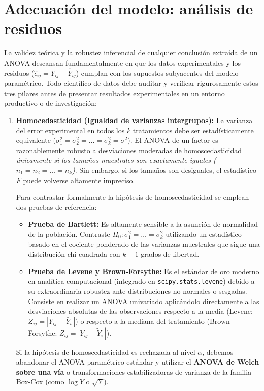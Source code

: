 \section{Adecuación del modelo: análisis de residuos}

La validez teórica y la robustez inferencial de cualquier conclusión extraída de un ANOVA descansan fundamentalmente en que los datos experimentales y los residuos ($\hat{\epsilon}_{ij} = Y_{ij} - \hat{Y}_{ij}$) cumplan con los supuestos subyacentes del modelo paramétrico. Todo científico de datos debe auditar y verificar rigurosamente estos tres pilares antes de presentar resultados experimentales en un entorno productivo o de investigación:

\begin{enumerate}
	\item \textbf{Homocedasticidad (Igualdad de varianzas intergrupos):} La varianza del error experimental en todos los $k$ tratamientos debe ser estadísticamente equivalente ($\sigma_1^2 = \sigma_2^2 = \ldots = \sigma_k^2 = \sigma^2$). El ANOVA de un factor es razonablemente robusto a desviaciones moderadas de homoscedasticidad \emph{únicamente si los tamaños muestrales son exactamente iguales ($n_1 = n_2 = \ldots = n_k$)}. Sin embargo, si los tamaños son desiguales, el estadístico $F$ puede volverse altamente impreciso.

	Para contrastar formalmente la hipótesis de homoscedasticidad se emplean dos pruebas de referencia:
	\begin{itemize}
		\item \textbf{Prueba de Bartlett:} Es altamente sensible a la asunción de normalidad de la población. Contraste $H_0: \sigma_1^2 = \ldots = \sigma_k^2$ utilizando un estadístico basado en el cociente ponderado de las varianzas muestrales que sigue una distribución chi-cuadrada con $k-1$ grados de libertad.
		\item \textbf{Prueba de Levene y Brown-Forsythe:} Es el estándar de oro moderno en analítica computacional (integrado en \texttt{scipy.stats.levene}) debido a su extraordinaria robustez ante distribuciones no normales o sesgadas. Consiste en realizar un ANOVA univariado aplicándolo directamente a las desviaciones absolutas de las observaciones respecto a la media (Levene: $Z_{ij} = |Y_{ij} - \bar{Y}_{i.}|$) o respecto a la mediana del tratamiento (Brown-Forsythe: $Z_{ij} = |Y_{ij} - \tilde{Y}_{i.}|$).
	\end{itemize}
	Si la hipótesis de homoscedasticidad es rechazada al nivel $\alpha$, debemos abandonar el ANOVA paramétrico estándar y utilizar el \textbf{ANOVA de Welch sobre una vía} o transformaciones estabilizadoras de varianza de la familia Box-Cox (como $\log Y$ o $\sqrt{Y}$).


\end{enumerate}
